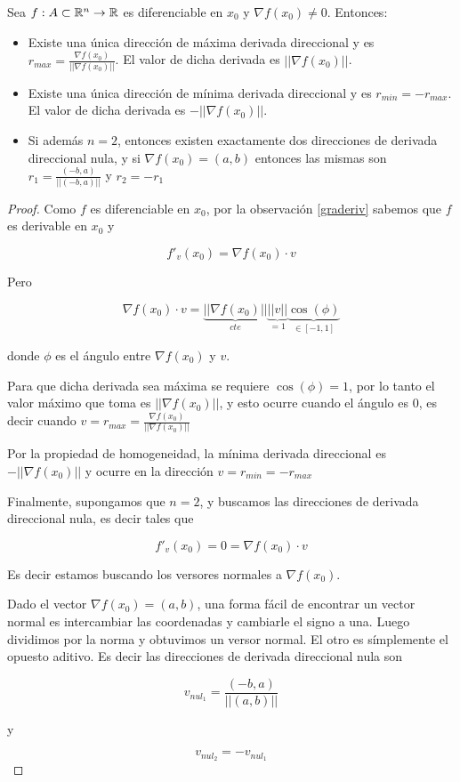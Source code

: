 \begin{proposition}
Sea $ f : A \subset \mathbb{R}^n \to \mathbb{R}$ es diferenciable en $ x_0 $ y $\nabla f(x_0) \neq 0$.  Entonces:

\begin{itemize}
\item Existe una única dirección de máxima derivada direccional y es $r_{max} = \frac{\nabla f(x_0)}{||\nabla f(x_0)||}$.  El valor de dicha derivada es $||\nabla f(x_0)||$.

\item Existe una única dirección de mínima derivada direccional y es $r_{min} = - r_{max}$.  El valor de dicha derivada es $ - ||\nabla f(x_0)||$.

\item Si además $n=2$, entonces existen exactamente dos direcciones de derivada direccional nula, y si $\nabla f(x_0) = (a,b)$ entonces las mismas son $r_1 = \frac{(-b,a)}{||(-b,a)||}$ y $r_2 = - r_1$
\end{itemize}

\end{proposition}

\begin{proof}
Como $f$ es diferenciable en $x_0$, por la observación \ref{graderiv} sabemos que $f$ es derivable en $x_0$ y

$$ f'_v(x_0) = \nabla f(x_0) \cdot v $$

Pero

\[ \nabla f(x_0) \cdot v = \underbrace{|| \nabla f(x_0)||}_{cte} \underbrace{||v||}_{=1} \underbrace{\cos(\phi)}_{\in [-1,1]} \]

donde $\phi$ es el ángulo entre $\nabla f(x_0)$ y $v$.

Para que dicha derivada sea máxima se requiere $ \cos(\phi) = 1$, por lo tanto el valor máximo que toma es $ || \nabla f(x_0)||$, y esto ocurre cuando el ángulo es 0, es decir cuando $v = r_{max} = \frac{\nabla f(x_0)}{||\nabla f(x_0)||}$

Por la propiedad de homogeneidad, la mínima derivada direccional es $ - || \nabla f(x_0)||$ y ocurre en la dirección $v = r_{min} = - r_{max}$

Finalmente, supongamos que $n=2$, y buscamos las direcciones de derivada direccional nula, es decir tales que

$$ f'_v(x_0) = 0 = \nabla f(x_0) \cdot v$$

Es decir estamos buscando los versores normales a $\nabla f(x_0)$.  

Dado el vector $\nabla f(x_0) = (a,b)$, una forma fácil de encontrar un vector normal es intercambiar las coordenadas y cambiarle el signo a una.  Luego dividimos por la norma y obtuvimos un versor normal.  El otro es símplemente el opuesto aditivo.  Es decir las direcciones de derivada direccional nula son

$$ v_{nul_1} = \frac{(-b,a)}{||(a,b)||} $$

y 

$$ v_{nul_2} = - v_{nul_1} $$
\end{proof}

